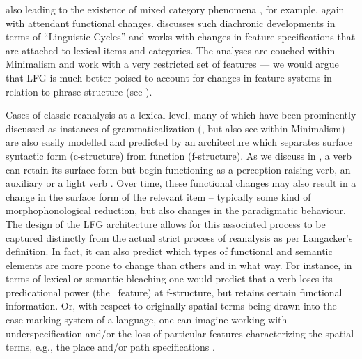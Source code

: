 \documentclass[output=paper,hidelinks]{langscibook}
\begin{document}
also leading to the existence of mixed category phenomena \citep{Nikitina2008}, for example, again with attendant functional changes.  discusses such diachronic developments in terms of ``Linguistic Cycles'' and works with changes in feature specifications that are attached to lexical items and categories. The analyses are  couched within Minimalism and work with a very restricted set of features --- we would argue that LFG is much better poised to account for changes in feature systems in relation to phrase structure (see ).

Cases of classic reanalysis at a lexical level, many of which have been prominently discussed as instances of grammaticalization  (\citealt{hopper_traugott_2003,narrog_heine_2017}, but also see \citealt{robertsroussou03} within Minimalism) are also easily modelled and predicted by an architecture which separates surface syntactic form (c-structure) from function (f-structure). As we discuss in , a verb can retain its surface form but begin functioning as a perception raising verb, an auxiliary or a light verb \citep{barron2001,butt-lahiri2013}.   Over time, these functional changes may also result in a change in the surface form of the relevant item -- typically some kind of morphophonological reduction, but also changes in the paradigmatic behaviour. The design of the LFG architecture allows for this associated process to be captured distinctly from the actual strict process of reanalysis as per Langacker's definition. In fact, it can also predict which types of functional and semantic elements are more prone to change than others and in what way.  For instance, in terms of lexical or semantic bleaching one would predict that a verb loses its predicational power (the \PRED\ feature) at f-structure, but retains certain functional information.  Or, with respect to originally spatial terms being drawn into the case-marking system of a language, one can imagine working with underspecification and/or the loss of particular features characterizing the spatial terms, e.g., the {\sc place} and/or {\sc path} specifications \citep{ahmed09}. 
\end{document}
